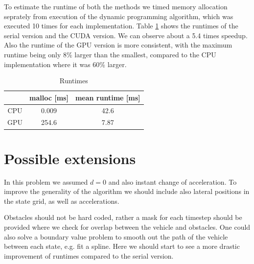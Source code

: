 \documentclass[a4paper,10pt,twocolumn]{article}
\begin{document}
To estimate the runtime of both the methods we timed 
memory allocation seprately from execution of the dynamic 
programming algorithm, which was executed 10 times 
for each implementation. Table \ref{tab:runtimes} shows 
the runtimes of the serial version and the CUDA version.
We can observe about a 5.4 times speedup. Also the 
runtime of the GPU version is more consistent, 
with the maximum runtime being only 8\% larger than 
the smallest, compared to the CPU implementation where 
it was 60\% larger.



\begin{table}
  \center
  \caption{Runtimes}
  \label{tab:runtimes}
  \vspace{0.1cm}
  \begin{tabular}{ c c c}

        & malloc [ms] & mean runtime [ms] \\
    \hline
    CPU & 0.009       & 42.6              \\
    GPU & 254.6       & 7.87
  \end{tabular}
\end{table}



\section{Possible extensions}

In this problem we assumed $d=0$ and also instant change of 
acceleration. To improve the generality of the algorithm 
we should include also lateral positions in the state 
grid, as well as accelerations.

Obstacles should not be hard coded, rather a mask for each timestep
should be provided where we check for overlap between the vehicle and
obstacles.  One could also solve a boundary value problem to smooth
out the path of the vehicle between each state, e.g. fit a spline.
Here we should start to see a more drastic improvement of runtimes 
compared to the serial version.
\end{document}
